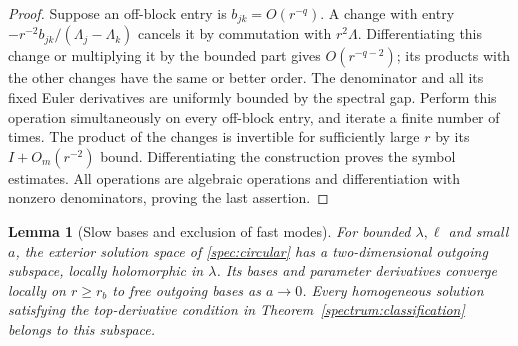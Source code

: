 \documentclass[11pt]{article}
\numberwithin{equation}{section}
\newtheorem{lemma}[theorem]{Lemma}
\theoremstyle{definition}
\theoremstyle{remark}
\begin{document}
\begin{proof}
Suppose an off-block entry is $b_{jk}=O(r^{-q})$. A change with entry
$-r^{-2}b_{jk}/(\Lambda_j-\Lambda_k)$ cancels it by commutation with
$r^2\Lambda$. Differentiating this change or multiplying it by the
bounded part gives $O(r^{-q-2})$; its products with the other changes
have the same or better order. The denominator and all its fixed
Euler derivatives are uniformly bounded by the spectral gap.
Perform this operation simultaneously on every off-block entry, and
iterate a finite number of times. The product of the changes is
invertible for sufficiently large $r$ by its $I+O_m(r^{-2})$ bound.
Differentiating the construction proves the symbol estimates. All
operations are algebraic operations and differentiation with nonzero
denominators, proving the last assertion.
\end{proof}

\begin{lemma}[Slow bases and exclusion of fast modes]\label{spec:slow-basis}
For bounded $\lambda,\ell$ and small $a$, the exterior solution space
of \eqref{spec:circular} has a two-dimensional outgoing subspace,
locally holomorphic in $\lambda$. Its bases and parameter derivatives
converge locally on $r\ge r_b$ to free outgoing bases as $a\to0$.
Every homogeneous solution satisfying the top-derivative condition
in Theorem~\ref{spectrum:classification} belongs to this subspace.
\end{lemma}
\end{document}
